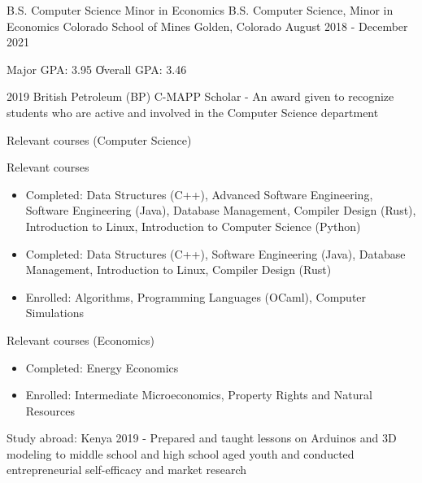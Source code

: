 \vspace{-2.0mm}


\begin{cventries}

  \cventry
    {\ifcv B.S. Computer Science \newline \vspace{-1mm} Minor in Economics \else B.S. Computer Science, Minor in Economics \fi}
    {Colorado School of Mines} %
    {Golden, Colorado} %
    {August 2018 - December 2021} %
    {
      \begin{cvitems} %
        \item {Major GPA: 3.95 \| Overall GPA: 3.46}
    \item {2019 British Petroleum (BP) C-MAPP Scholar - An award given to recognize students who are active and involved in the Computer Science department}
        \ifcv
        \item {Relevant courses (Computer Science)}
        \else
        \item {Relevant courses}
        \fi
        \begin {itemize}
        \ifcv
               \item {Completed: Data Structures (C++), Advanced Software Engineering, Software
    Engineering (Java), Database Management, Compiler Design (Rust), Introduction to Linux, Introduction to Computer Science (Python)}
    \else
    \item {Completed: Data Structures (C++), Software
    Engineering (Java), Database Management, Introduction to Linux, Compiler Design (Rust)}
    \fi
        \item {Enrolled: Algorithms, Programming Languages (OCaml), Computer Simulations}
        \end {itemize}
        \ifcv
        \item {Relevant courses (Economics)}
        \begin{itemize}
          \item Completed: Energy Economics
          \item Enrolled: Intermediate Microeconomics, Property Rights and Natural Resources
        \end{itemize}
        \fi
    \ifcv
\item {Study abroad: Kenya 2019 - Prepared and taught lessons on Arduinos and 3D modeling to
middle school and high school aged youth and conducted entrepreneurial self-efficacy and market research }
\fi
      \end{cvitems}
    }
    {}
\end{cventries}